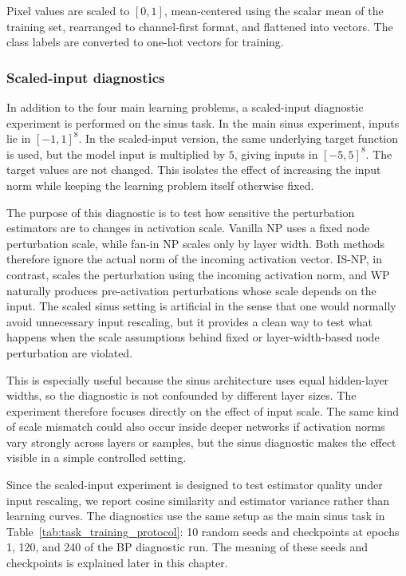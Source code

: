 Pixel values are scaled to \([0,1]\), mean-centered using the scalar mean of the training set, rearranged to channel-first format, and flattened into vectors. The class labels are converted to one-hot vectors for training.

\subsubsection{Scaled-input diagnostics}

In addition to the four main learning problems, a scaled-input diagnostic experiment is performed on the sinus task. In the main sinus experiment, inputs lie in \([-1,1]^8\). In the scaled-input version, the same underlying target function is used, but the model input is multiplied by \(5\), giving inputs in \([-5,5]^8\). The target values are not changed. This isolates the effect of increasing the input norm while keeping the learning problem itself otherwise fixed.

The purpose of this diagnostic is to test how sensitive the perturbation estimators are to changes in activation scale. Vanilla NP uses a fixed node perturbation scale, while fan-in NP scales only by layer width. Both methods therefore ignore the actual norm of the incoming activation vector. IS-NP, in contrast, scales the perturbation using the incoming activation norm, and WP naturally produces pre-activation perturbations whose scale depends on the input. The scaled sinus setting is artificial in the sense that one would normally avoid unnecessary input rescaling, but it provides a clean way to test what happens when the scale assumptions behind fixed or layer-width-based node perturbation are violated.

This is especially useful because the sinus architecture uses equal hidden-layer widths, so the diagnostic is not confounded by different layer sizes. The experiment therefore focuses directly on the effect of input scale. The same kind of scale mismatch could also occur inside deeper networks if activation norms vary strongly across layers or samples, but the sinus diagnostic makes the effect visible in a simple controlled setting.

Since the scaled-input experiment is designed to test estimator quality under input rescaling, we report cosine similarity and estimator variance rather than learning curves. The diagnostics use the same setup as the main sinus task in Table~\ref{tab:task_training_protocol}: 10 random seeds and checkpoints at epochs 1, 120, and 240 of the BP diagnostic run. The meaning of these seeds and checkpoints is explained later in this chapter.

